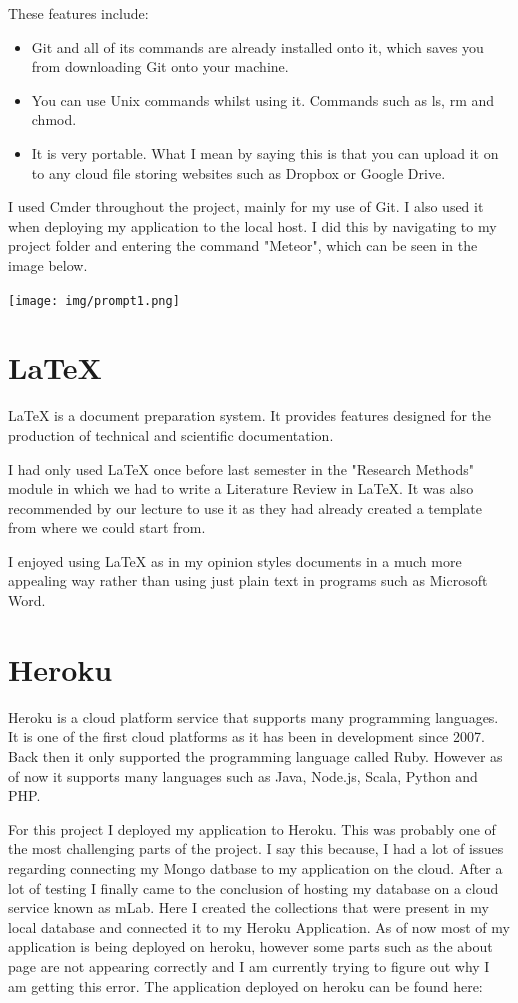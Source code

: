 These features include:
\begin{itemize}
\item Git and all of its commands are already installed onto it, which saves you from downloading Git onto your machine.
\item You can use Unix commands whilst using it. Commands such as ls, rm and chmod.
\item It is very portable. What I mean by saying this is that you can upload it on to any cloud file storing websites such as Dropbox or Google Drive.

\end{itemize}

I used Cmder throughout the project, mainly for my use of Git. I also used it when deploying my application to the local host. I did this by navigating to my project folder and entering the command "Meteor", which can be seen in the image below.

\begin{center}    
  \texttt{[image: img/prompt1.png]}
  \end{center}
  
  \section{LaTeX}
  LaTeX is a document preparation system. It provides features designed for the production of technical and scientific documentation\cite{LaTeX}. 
  
  I had only used LaTeX once before last semester in the "Research Methods" module in which we had to write a Literature Review in LaTeX. It was also recommended by our lecture to use it as they had already created a template from where we could start from.
  
  I enjoyed using LaTeX as in my opinion styles documents in a much more appealing way rather than using just plain text in programs such as Microsoft Word.
  
  \section{Heroku}
  Heroku is a cloud platform service that supports many programming languages. It is one of the first cloud platforms as it has been in development since 2007. Back then it only supported the programming language called Ruby. However as of now it supports many languages such as Java, Node.js, Scala, Python and PHP\cite{Heroku}.
  
  For this project I deployed my application to Heroku. This was probably one of the most challenging parts of the project. I say this because, I had a lot of issues regarding connecting my Mongo datbase to my application on the cloud. After a lot of testing I finally came to the conclusion of hosting my database on a cloud service known as mLab. Here I created the collections that were present in my local database and connected it to my Heroku Application. As of now most of my application is being deployed on heroku, however some parts such as the about page are not appearing correctly and I am currently trying to figure out why I am getting this error. The application deployed on heroku can be found here:
  
